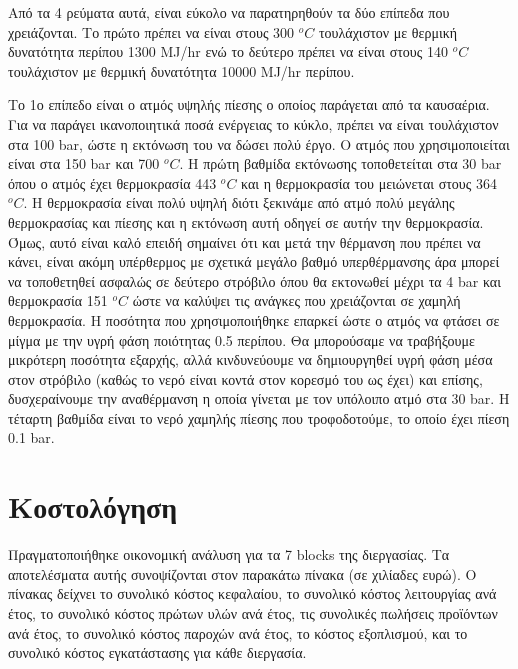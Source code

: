 \documentclass[11pt]{article}
\begin{document}
Από τα 4 ρεύματα αυτά, είναι εύκολο να παρατηρηθούν τα δύο επίπεδα που χρειάζονται. Το πρώτο πρέπει να είναι στους 300 \(^oC\) τουλάχιστον με θερμική δυνατότητα περίπου 1300 MJ/hr ενώ το δεύτερο πρέπει να είναι στους 140 \(^oC\) τουλάχιστον με θερμική δυνατότητα 10000 MJ/hr περίπου. 

Το 1ο επίπεδο είναι ο ατμός υψηλής πίεσης ο οποίος παράγεται από τα καυσαέρια. Για να παράγει ικανοποιητικά ποσά ενέργειας το κύκλο, πρέπει να είναι τουλάχιστον στα 100 bar, ώστε η εκτόνωση του να δώσει πολύ έργο. Ο ατμός που χρησιμοποιείται είναι στα 150 bar και 700 \(^oC\). Η πρώτη βαθμίδα εκτόνωσης τοποθετείται στα 30 bar όπου ο ατμός έχει θερμοκρασία 443 \(^oC\) και η θερμοκρασία του μειώνεται στους 364 \(^oC\). Η θερμοκρασία είναι πολύ υψηλή διότι ξεκινάμε από ατμό πολύ μεγάλης θερμοκρασίας και πίεσης και η εκτόνωση αυτή οδηγεί σε αυτήν την θερμοκρασία. Όμως, αυτό είναι καλό επειδή σημαίνει ότι και μετά την θέρμανση που πρέπει να κάνει, είναι ακόμη υπέρθερμος με σχετικά μεγάλο βαθμό υπερθέρμανσης άρα μπορεί να τοποθετηθεί ασφαλώς σε δεύτερο στρόβιλο όπου θα εκτονωθεί μέχρι τα 4 bar και θερμοκρασία 151 \(^oC\) ώστε να καλύψει τις ανάγκες που χρειάζονται σε χαμηλή θερμοκρασία. Η ποσότητα που χρησιμοποιήθηκε επαρκεί ώστε ο ατμός να φτάσει σε μίγμα με την υγρή φάση ποιότητας 0.5 περίπου. Θα μπορούσαμε να τραβήξουμε μικρότερη ποσότητα εξαρχής, αλλά κινδυνεύουμε να δημιουργηθεί υγρή φάση μέσα στον στρόβιλο (καθώς το νερό είναι κοντά στον κορεσμό του ως έχει) και επίσης, δυσχεραίνουμε την αναθέρμανση η οποία γίνεται με τον υπόλοιπο ατμό στα 30 bar. Η τέταρτη βαθμίδα είναι το νερό χαμηλής πίεσης που τροφοδοτούμε, το οποίο έχει πίεση 0.1 bar.

\section{Κοστολόγηση}
\label{sec:org161218a}
Πραγματοποιήθηκε οικονομική ανάλυση για τα 7 blocks της διεργασίας. Τα
αποτελέσματα αυτής συνοψίζονται στον παρακάτω πίνακα (σε χιλίαδες ευρώ). Ο πίνακας δείχνει το συνολικό κόστος κεφαλαίου, το συνολικό
κόστος λειτουργίας ανά έτος, το συνολικό κόστος πρώτων υλών ανά έτος,
τις συνολικές πωλήσεις προϊόντων ανά έτος, το συνολικό κόστος παροχών
ανά έτος, το κόστος εξοπλισμού, και το συνολικό κόστος εγκατάστασης για
κάθε διεργασία.
\end{document}
